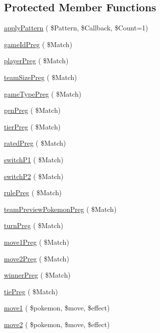 \subsection*{Protected Member Functions}
\begin{DoxyCompactItemize}
\item 
\hyperlink{class_coll_parser_ad482ec1ae68430dd0a2bdc60faf32ced}{apply\+Pattern} ( \$Pattern, \$Callback, \$Count=1)
\item 
\hyperlink{class_coll_parser_a89a255cb6842c7992021a47fea2f8303}{game\+Id\+Preg} ( \$Match)
\item 
\hyperlink{class_coll_parser_aa9797be8edfc480ed489ff5a68a8fd92}{player\+Preg} ( \$Match)
\item 
\hyperlink{class_coll_parser_aecd19071144d47fe4a75030de343bf5a}{team\+Size\+Preg} ( \$Match)
\item 
\hyperlink{class_coll_parser_aa30643c8dbda4c34c0fdeaf1018c620a}{game\+Type\+Preg} ( \$Match)
\item 
\hyperlink{class_coll_parser_aee90e9a89c8fd155d72cddf36240e347}{gen\+Preg} ( \$Match)
\item 
\hyperlink{class_coll_parser_a21dea24b254ec24a5d0cb5c233043a8d}{tier\+Preg} ( \$Match)
\item 
\hyperlink{class_coll_parser_a3d6b54a92a85ffb379de62914687aa65}{rated\+Preg} ( \$Match)
\item 
\hyperlink{class_coll_parser_a69196772c6fbb721c22080ab82e1ea7a}{switch\+P1} ( \$Match)
\item 
\hyperlink{class_coll_parser_ab14ed8fd90b3a58b7589d0e46057fc06}{switch\+P2} ( \$Match)
\item 
\hyperlink{class_coll_parser_a9712c0a4898503e75816eab8322b7f8b}{rule\+Preg} ( \$Match)
\item 
\hyperlink{class_coll_parser_a0adee1fa910879cf58ba3914563a7c80}{team\+Preview\+Pokemon\+Preg} ( \$Match)
\item 
\hyperlink{class_coll_parser_a2f101c518748f0b3bc9705931b093f51}{turn\+Preg} ( \$Match)
\item 
\hyperlink{class_coll_parser_a80e6d75331d3dbd3af52d6bcc0423bf2}{move1\+Preg} ( \$Match)
\item 
\hyperlink{class_coll_parser_ab7104974448aef9449d17923a8ba9284}{move2\+Preg} ( \$Match)
\item 
\hyperlink{class_coll_parser_a69653970e854541c1627eb25fa271d32}{winner\+Preg} ( \$Match)
\item 
\hyperlink{class_coll_parser_a6fa0362052ba34bde64b06a953320dc2}{tie\+Preg} ( \$Match)
\item 
\hyperlink{class_coll_parser_a7c44afe03c478fa3e9c6ac200d0ce9a4}{move1} ( \$pokemon, \$move, \$effect)
\item 
\hyperlink{class_coll_parser_a574a74a20fa3e11fa4daa023789f50de}{move2} ( \$pokemon, \$move, \$effect)
\end{DoxyCompactItemize}
